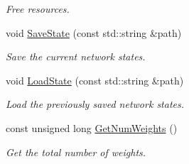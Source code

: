 \begin{DoxyCompactItemize}
\begin{DoxyCompactList}\small\item\em Free resources. \end{DoxyCompactList}\item 
void \hyperlink{classfractal_1_1Rnn_a34a6ff28eb4507ef1ae8d88089c3161f}{Save\+State} (const std\+::string \&path)
\begin{DoxyCompactList}\small\item\em Save the current network states. \end{DoxyCompactList}\item 
void \hyperlink{classfractal_1_1Rnn_a50c21992806cf5bf160ec9c3b9a07a15}{Load\+State} (const std\+::string \&path)
\begin{DoxyCompactList}\small\item\em Load the previously saved network states. \end{DoxyCompactList}\item 
const unsigned long \hyperlink{classfractal_1_1Rnn_af78a3d552f1abaa0ad8176a296ca72b4}{Get\+Num\+Weights} ()
\begin{DoxyCompactList}\small\item\em Get the total number of weights. \end{DoxyCompactList}\end{DoxyCompactItemize}
